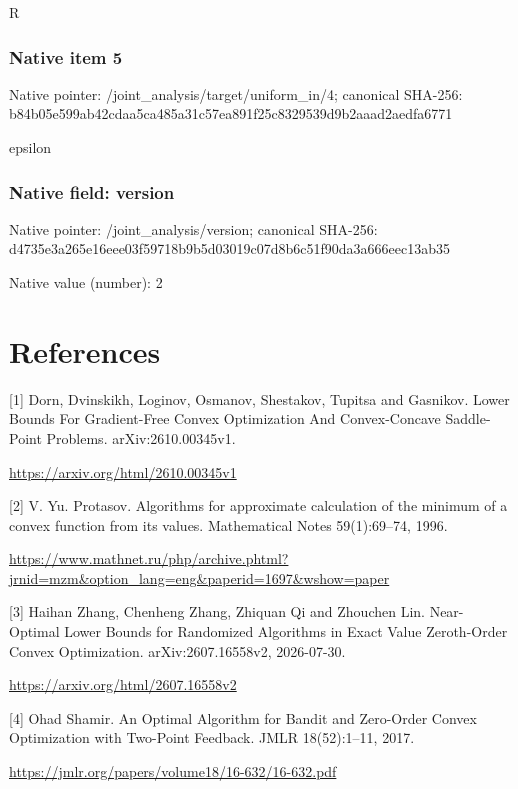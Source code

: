 \documentclass[10pt,a4paper]{article}
\begin{document}
\begingroup\raggedright\sloppy R\par\endgroup

\subsubsection{Native item 5}
Native pointer: /joint\_\allowbreak{}analysis/target/uniform\_\allowbreak{}in/4; canonical SHA-256: b84b05e599ab42cdaa5ca485a31c57ea891f25c8329539d9b2aaad2aedfa6771

\begingroup\raggedright\sloppy epsilon\par\endgroup

\subsubsection{Native field: version}
Native pointer: /joint\_\allowbreak{}analysis/version; canonical SHA-256: d4735e3a265e16eee03f59718b9b5d03019c07d8b6c51f90da3a666eec13ab35

Native value (number): 2

\section{References}
[1] Dorn, Dvinskikh, Loginov, Osmanov, Shestakov, Tupitsa and Gasnikov. Lower Bounds For Gradient-Free Convex Optimization And Convex-Concave Saddle-Point Problems. arXiv:2610.00345v1.

\url{https://arxiv.org/html/2610.00345v1}

[2] V. Yu. Protasov. Algorithms for approximate calculation of the minimum of a convex function from its values. Mathematical Notes 59(1):69--74, 1996.

\url{https://www.mathnet.ru/php/archive.phtml?jrnid=mzm&option_lang=eng&paperid=1697&wshow=paper}

[3] Haihan Zhang, Chenheng Zhang, Zhiquan Qi and Zhouchen Lin. Near-Optimal Lower Bounds for Randomized Algorithms in Exact Value Zeroth-Order Convex Optimization. arXiv:2607.16558v2, 2026-07-30.

\url{https://arxiv.org/html/2607.16558v2}

[4] Ohad Shamir. An Optimal Algorithm for Bandit and Zero-Order Convex Optimization with Two-Point Feedback. JMLR 18(52):1--11, 2017.

\url{https://jmlr.org/papers/volume18/16-632/16-632.pdf}
\end{document}
